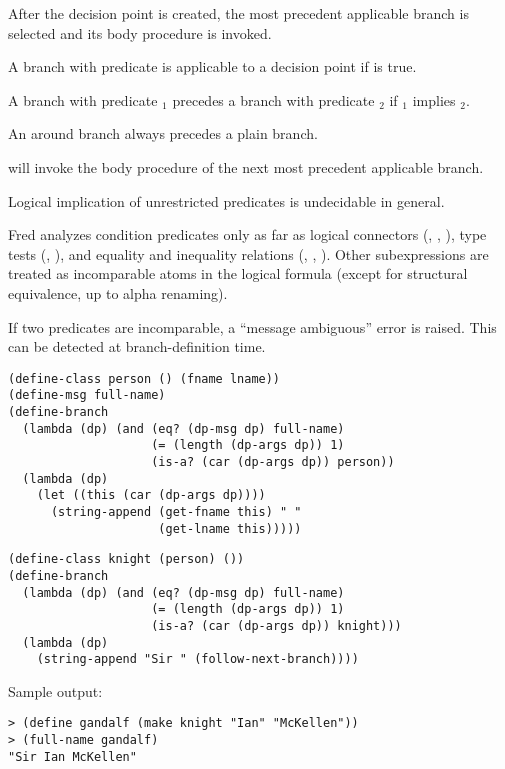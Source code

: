 \documentclass[landscape]{slides}
\begin{document}
\begin{slide}
After the decision point is created, the most precedent applicable
branch is selected and its body procedure is invoked.
\begin{bullets}
\item A branch with predicate  is applicable to a decision
      point  if  is true.

\item A branch with predicate $_1$ precedes a
      branch with predicate $_2$ if $_1$ implies
      $_2$.

\item An around branch always precedes a plain branch.
\end{bullets}
 will invoke the body procedure of the next 
most precedent applicable branch.
\end{slide}

\begin{slide}
Logical implication of unrestricted predicates is undecidable in
general.

Fred analyzes condition predicates only as far as logical connectors
(, , ), type tests (,
), and equality and inequality relations
(, \code{=}, \code{<=}).  Other subexpressions are treated
as incomparable atoms in the logical formula (except for
structural equivalence, up to alpha renaming).

If two predicates are incomparable, a ``message ambiguous'' error is
raised.  This can be detected at branch-definition time.
\end{slide}

\begin{slide}
\begin{verbatim}
(define-class person () (fname lname))
(define-msg full-name)
(define-branch
  (lambda (dp) (and (eq? (dp-msg dp) full-name)
                    (= (length (dp-args dp)) 1)
                    (is-a? (car (dp-args dp)) person))
  (lambda (dp)
    (let ((this (car (dp-args dp))))
      (string-append (get-fname this) " "
                     (get-lname this)))))
\end{verbatim}
\end{slide}

\begin{slide}
\begin{verbatim}
(define-class knight (person) ())
(define-branch
  (lambda (dp) (and (eq? (dp-msg dp) full-name)
                    (= (length (dp-args dp)) 1)
                    (is-a? (car (dp-args dp)) knight)))
  (lambda (dp)
    (string-append "Sir " (follow-next-branch))))
\end{verbatim}
Sample output:
\begin{verbatim}
> (define gandalf (make knight "Ian" "McKellen"))
> (full-name gandalf)
"Sir Ian McKellen"
\end{verbatim}
\end{slide}
\end{document}
